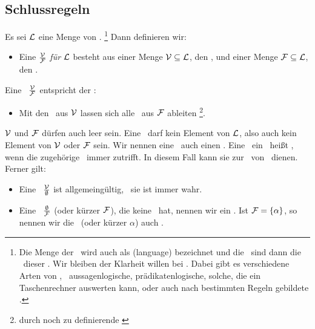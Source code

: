 \subsection{Schlussregeln}%
\label{sub:Schlussregeln}

Es sei $\mathcal{L}$ eine Menge von \Formeln.%
	\footnote{%
	Die Menge der \Formeln\ wird auch als  (language) bezeichnet und die \Formeln\ sind dann die \Worte\ dieser \Sprache.
	Wir bleiben der Klarheit willen bei \Formel.
	Dabei gibt es verschiedene Arten von \Formeln, \textzB\ aussagenlogische, prädikatenlogische, solche, die ein Taschenrechner auswerten kann, oder auch nach bestimmten Regeln gebildete \Zeichenketten.
}
Dann definieren wir:
\begin{itemize}
	\item[] Eine  $\frac{\mathcal{V}}{\mathcal{F}}$ \emph{für} $\mathcal{L}$ besteht aus einer Menge $\mathcal{V}\subseteq\mathcal{L}$, den , und einer Menge $\mathcal{F}\subseteq\mathcal{L}$, den .
\end{itemize}
Eine \Schlussregel\ $\frac{\mathcal{V}}{\mathcal{F}}$ entspricht der \Aussage:
%
\begin{itemize}
	\item[] Mit den \Voraussetzungen\ aus $\mathcal{V}$ lassen sich alle \Folgerungen\ aus $\mathcal{F}$ ableiten%
	\footnote{durch noch zu definierende \emph{\zulaessigeTransformationen}}.
\end{itemize}
%
$\mathcal{V}$ und $\mathcal{F}$ dürfen auch leer sein.
Eine \Schlussregel\ darf kein Element von $\mathcal{L}$, also auch kein Element von $\mathcal{V}$ oder $\mathcal{F}$ sein.
Wir nennen eine \Schlussregel\ auch einen .
Eine  \textbzw\ ein \formalerSatz\ heißt , wenn die zugehörige \Aussage\ immer zutrifft.
In diesem Fall kann sie zur \zulaessigenTransformation\ von \Formeln\ dienen.
Ferner gilt:
%
\begin{itemize}
	\item Eine \Schlussregel\ $\frac{\mathcal{V}}{\emptyset}$ ist allgemeingültig, \textdh\ sie ist immer wahr.
	\item Eine \Schlussregel\ $\frac{\emptyset}{\mathcal{F}}$ (oder kürzer $\mathcal{F}$), die keine \Voraussetzungen\ hat, nennen wir ein .
	Ist $\mathcal{F} = \{\alpha\}$, so nennen wir die \Schlussregel\ (oder kürzer $\alpha$) auch .
\end{itemize}


